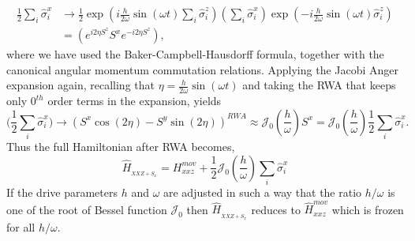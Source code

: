 \documentclass[aps,prb,reprint,showpacs,floatfix,superscriptaddress, onecolumn, nofootinbib, 9pt]{revtex4-2}
\begin{document}
\begin{enumerate}
{\begin{align*}
				\frac12 \sum_i \hat{\sigma}^x_i & \rightarrow\frac{1}{2} \exp \left(i \frac{h}{2 \omega} \sin (\omega t) \sum_{i} \hat{\sigma}_{i}^{z}\right)\left(\sum_{i} \hat{\sigma}_{i}^{x}\right) \exp \left(-i \frac{h}{2 \omega} \sin (\omega t) \hat{\sigma}_{i}^{z}\right) \\
				& =\left(e^{i 2 \eta S^{z}} S^{x} e^{-i 2 \eta S^{z}}\right),
			\end{align*}
			where we have used the Baker-Campbell-Hausdorff formula, together with the canonical angular momentum commutation relations. Applying the Jacobi Anger expansion again, recalling that $\eta=\frac{h}{2 \omega} \sin (\omega t)$ and taking the RWA that keeps only $0^{th}$ order terms in the expansion, yields
			\begin{equation}
				\Big(\frac12 \sum_i \hat{\sigma}^x_i\Big) \rightarrow \left(S^{x} \cos (2 \eta)-S^{y} \sin (2 \eta)\right)^{RWA} \approx \mathcal{J}_{0}\left(\frac{h}{\omega}\right) S^{x} = \mathcal{J}_{0}\left(\frac{h}{\omega}\right)\frac12\sum_i\hat{\sigma}^x_i.
			\end{equation}
		Thus the full Hamiltonian after RWA becomes,
		\begin{equation}
		\hat{H}_{_{XXZ + S_x}} = H^{mov}_{xxz} + \frac12 \mathcal{J}_{0}\left(\frac{h}{\omega}\right)\sum_i\hat{\sigma}^x_i
		\end{equation}
		If the drive parameters $h$ and $\omega$ are adjusted in such a way that the ratio $h/\omega$ is one of the root of Bessel function $\mathcal{J}_0$ then $\hat{H}_{_{XXZ + S_x}}$ reduces to $\hat{H}_{xxz}^{mov}$ which is frozen for all $h/\omega$.
				
}
\end{enumerate}
\end{document}
